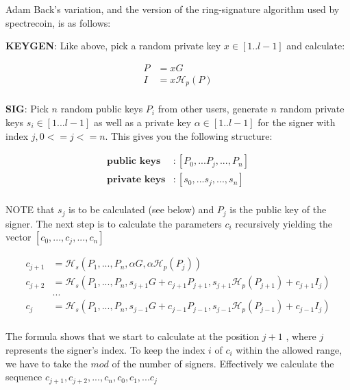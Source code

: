 \hfill \break Adam Back's variation, and the version of the ring-signature algorithm used by spectrecoin, is as follows:

\hfill \break\textbf{KEYGEN}: Like above, pick a random private key $x \in [1..l-1]$ and calculate:

\begin{equation}
\begin{split}
P &= xG\\
I &= x\mathcal{H}_p(P)\\ 
\end{split}
\end{equation}

\hfill \break\textbf{SIG}: Pick $n$ random public keys $P_i$ from other users, generate $n$ random private keys $s_i \in [1...l-1]$ as well as a private key $\alpha \in [1..l-1]$ for the signer with index $j, 0<=j<=n$. This gives you the following structure:

\begin{equation}
\begin{split}
\textbf{public keys} &: [P_0, ... P_j, ..., P_n] \\
\textbf{private keys} &: [s_0, ... s_j, ..., s_n] \\
\end{split}
\end{equation}

\hfill \break NOTE that $s_j$ is to be calculated (see below) and $P_j$ is the public key of the signer. The next step is to calculate the parameters $c_i$ recursively yielding the vector $[c_0, ... ,c_j, ..., c_n]$

\begin{equation}
\begin{split}
  c_{j+1} & = \mathcal{H}_s(P_1, ..., P_n, \alpha G, \alpha \mathcal{H}_p(P_j))\\
  c_{j+2} & = \mathcal{H}_s(P_1,...,P_n,s_{j+1}G+c_{j+1}P_{j+1},s_{j+1}\mathcal{H}_p(P_{j+1})+c_{j+1}I_j)\\
	      & ... \\
  c_{j} & = \mathcal{H}_s(P_1,...,P_n,s_{j-1}G+c_{j-1}P_{j-1},s_{j-1}\mathcal{H}_p(P_{j-1})+c_{j-1}I_j) \\
\end{split}
\end{equation}

\hfill \break The formula shows that we start to calculate at the position $j+1$ , where $j$ represents the signer's index. To keep the index $i$ of $c_i$ within the allowed range, we have to take the $mod$ of the number of signers. Effectively we calculate the sequence $c_{j+1}, c_{j+2}, ..., c_n, c_0, c_1, ... c_j$
 
